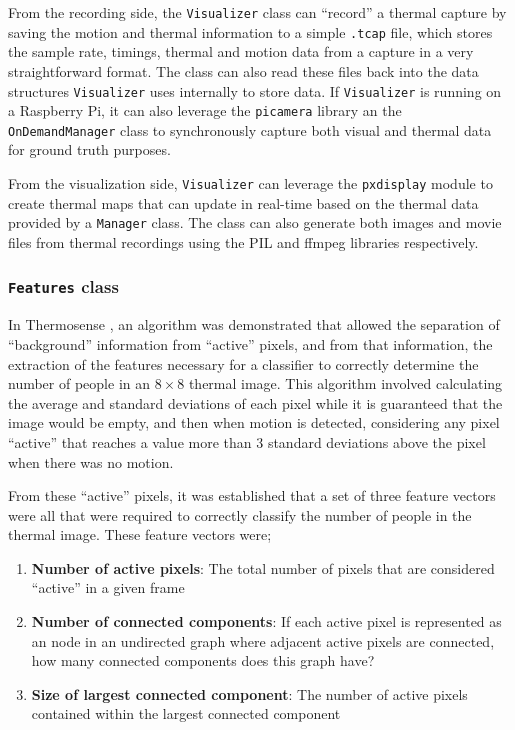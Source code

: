\documentclass[../thesis/thesis.tex]{subfiles}
\begin{document}
From the recording side, the \texttt{Visualizer} class can ``record'' a thermal capture by saving the motion and thermal information to a simple \texttt{.tcap} file, which stores the sample rate, timings, thermal and motion data from a capture in a very straightforward format. The class can also read these files back into the data structures \texttt{Visualizer} uses internally to store data. If \texttt{Visualizer} is running on a Raspberry Pi, it can also leverage the \texttt{picamera} library an the \texttt{OnDemandManager} class to synchronously capture both visual and thermal data for ground truth purposes.

From the visualization side, \texttt{Visualizer} can leverage the \texttt{pxdisplay} module to create thermal maps that can update in real-time based on the thermal data provided by a \texttt{Manager} class. The class can also generate both images and movie files from thermal recordings using the PIL and ffmpeg libraries respectively.

\subsubsection*{\texttt{Features} class}

In Thermosense \cite{beltran2013thermosense}, an algorithm was demonstrated that allowed the separation of ``background'' information from ``active'' pixels, and from that information, the extraction of the features necessary for a classifier to correctly determine the number of people in an $8\times8$ thermal image. This algorithm involved calculating the average and standard deviations of each pixel while it is guaranteed that the image would be empty, and then when motion is detected, considering any pixel ``active'' that reaches a value more than 3 standard deviations above the pixel when there was no motion.

From these ``active'' pixels, it was established that a set of three feature vectors were all that were required to correctly classify the number of people in the thermal image. These feature vectors were;
\begin{enumerate}
\item \textbf{Number of active pixels}: The total number of pixels that are considered ``active'' in a given frame
\item \textbf{Number of connected components}: If each active pixel is represented as an node in an undirected graph where adjacent active pixels are connected, how many connected components does this graph have?
\item \textbf{Size of largest connected component}: The number of active pixels contained within the largest connected component
\end{enumerate}
\end{document}
